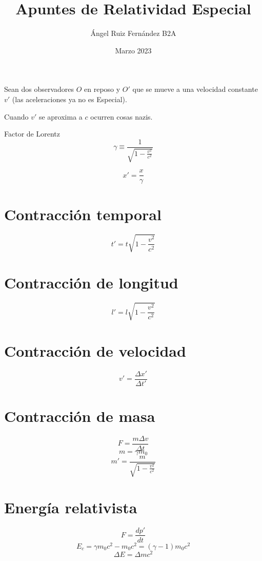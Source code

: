\documentclass[12pt, letterpaper, twoside]{article}
\title{Apuntes de Relatividad Especial}
\author{Ángel Ruiz Fernández B2A}
\date{Marzo 2023}
\begin{document}
	\maketitle
	
	Sean dos observadores $O$ en reposo y $O'$ que se mueve a una velocidad constante $v'$ (las aceleraciones ya no es Especial).
	
	Cuando $v'$ se aproxima a $c$ ocurren cosas nazis.
	
	Factor de Lorentz
	\begin{equation}
		\gamma \equiv \frac{1}{\sqrt{1 - \frac{v^2}{c^2}}}
	\end{equation}

	\begin{equation}
		x' = \frac{x}{\gamma}
	\end{equation}
	
	\section{Contracción temporal}
	\begin{equation}
		t ' = t \sqrt{1 - \frac{v^2}{c^2}}
	\end{equation}

	\section{Contracción de longitud}
	\begin{equation}
		l ' = l \sqrt{1 - \frac{v^2}{c^2}}
	\end{equation}

	\section{Contracción de velocidad}
	\begin{equation}
		v ' = \frac{\Delta x'}{\Delta t'}
	\end{equation}

	\section{Contracción de masa}
	\begin{equation}
		F = \frac{m\Delta v}{\Delta t}
	\end{equation}
	\begin{equation}
		m = \gamma m_0
	\end{equation}
	\begin{equation}
		m' = \frac{m}{\sqrt{1 - \frac{v^2}{c^2}}}
	\end{equation}

	\section{Energía relativista}
	\begin{equation}
		F = \frac{dp'}{dt}
	\end{equation}
	\begin{equation}
		E_c = \gamma m_0 c^2 - m_0 c^2 = (\gamma - 1) m_0 c^2
	\end{equation}
	\begin{equation}
		\Delta E = \Delta m c^2
	\end{equation}
	
	
\end{document}
